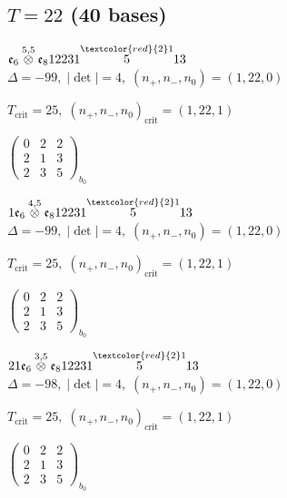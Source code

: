 \documentclass[10pt]{article}
\begin{document}
\subsection*{$T = 22$ \quad (40 bases)}
\smallskip

$\mathfrak{e}_6\overset{5,5}{\otimes}\mathfrak{e}_812231\overset{\textcolor{red}{2}1}{5}13$ \quad $\Delta=-99,\; |\det|=4,\; (n_+,n_-,n_0)=(1,22,0)$

\hspace{1em}$T_{\text{crit}}=25,\; (n_+,n_-,n_0)_{\text{crit}}=(1,22,1)$

\hspace{2em}$\left(\begin{smallmatrix}0 & 2 & 2 \\ 2 & 1 & 3 \\ 2 & 3 & 5\end{smallmatrix}\right)_{\!b_0}$

\smallskip

$1\mathfrak{e}_6\overset{4,5}{\otimes}\mathfrak{e}_812231\overset{\textcolor{red}{2}1}{5}13$ \quad $\Delta=-99,\; |\det|=4,\; (n_+,n_-,n_0)=(1,22,0)$

\hspace{1em}$T_{\text{crit}}=25,\; (n_+,n_-,n_0)_{\text{crit}}=(1,22,1)$

\hspace{2em}$\left(\begin{smallmatrix}0 & 2 & 2 \\ 2 & 1 & 3 \\ 2 & 3 & 5\end{smallmatrix}\right)_{\!b_0}$

\smallskip

$21\mathfrak{e}_6\overset{3,5}{\otimes}\mathfrak{e}_812231\overset{\textcolor{red}{2}1}{5}13$ \quad $\Delta=-98,\; |\det|=4,\; (n_+,n_-,n_0)=(1,22,0)$

\hspace{1em}$T_{\text{crit}}=25,\; (n_+,n_-,n_0)_{\text{crit}}=(1,22,1)$

\hspace{2em}$\left(\begin{smallmatrix}0 & 2 & 2 \\ 2 & 1 & 3 \\ 2 & 3 & 5\end{smallmatrix}\right)_{\!b_0}$
\end{document}
